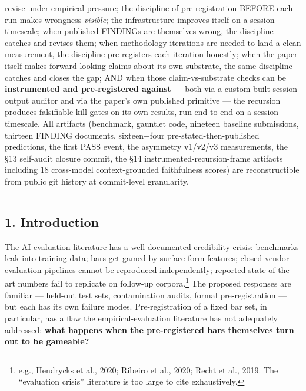 \documentclass[
]{article}
\begin{document}
revise under empirical pressure; the discipline of pre-registration
BEFORE each run makes wrongness \emph{visible}; the infrastructure
improves itself on a session timescale; when published FINDINGs are
themselves wrong, the discipline catches and revises them; when
methodology iterations are needed to land a clean measurement, the
discipline pre-registers each iteration honestly; when the paper itself
makes forward-looking claims about its own substrate, the same
discipline catches and closes the gap; AND when those claim-vs-substrate
checks can be \textbf{instrumented and pre-registered against} --- both
via a custom-built session-output auditor and via the paper's own
published primitive --- the recursion produces falsifiable kill-gates on
its own results, run end-to-end on a session timescale. All artifacts
(benchmark, gauntlet code, nineteen baseline submissions, thirteen
FINDING documents, sixteen+four pre-stated-then-published predictions,
the first PASS event, the asymmetry v1/v2/v3 measurements, the §13
self-audit closure commit, the §14 instrumented-recursion-frame
artifacts including 18 cross-model context-grounded faithfulness scores)
are reconstructible from public git history at commit-level granularity.

\begin{center}\rule{0.5\linewidth}{0.5pt}\end{center}

\subsection{1. Introduction}\label{introduction}

The AI evaluation literature has a well-documented credibility crisis:
benchmarks leak into training data; bars get gamed by surface-form
features; closed-vendor evaluation pipelines cannot be reproduced
independently; reported state-of-the-art numbers fail to replicate on
follow-up corpora.\footnote{e.g., Hendrycks et al., 2020; Ribeiro et
  al., 2020; Recht et al., 2019. The ``evaluation crisis'' literature is
  too large to cite exhaustively.} The proposed responses are familiar
--- held-out test sets, contamination audits, formal pre-registration
--- but each has its own failure modes. Pre-registration of a fixed bar
set, in particular, has a flaw the empirical-evaluation literature has
not adequately addressed: \textbf{what happens when the pre-registered
bars themselves turn out to be gameable?}
\end{document}
